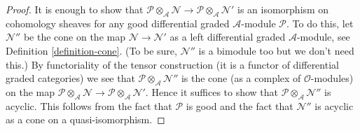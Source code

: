\documentclass[10pt,a4paper]{amsart}
\theoremstyle{plain}
\theoremstyle{definition}
\theoremstyle{remark}
\numberwithin{equation}{subsection}
\begin{document}
\begin{proof}
It is enough to show that
$\mathcal{P} \otimes_\mathcal{A} \mathcal{N} \to
\mathcal{P} \otimes_\mathcal{A} \mathcal{N}'$
is an isomorphism on cohomology sheaves for any good differential
graded $\mathcal{A}$-module $\mathcal{P}$.
To do this, let $\mathcal{N}''$ be the cone on the map
$\mathcal{N} \to \mathcal{N}'$ as a left differential graded
$\mathcal{A}$-module, see Definition \ref{definition-cone}.
(To be sure, $\mathcal{N}''$ is a bimodule too but we
don't need this.) By functoriality of the tensor construction
(it is a functor of differential graded categories)
we see that $\mathcal{P} \otimes_\mathcal{A} \mathcal{N}''$
is the cone (as a complex of $\mathcal{O}$-modules) on the map
$\mathcal{P} \otimes_\mathcal{A} \mathcal{N} \to
\mathcal{P} \otimes_\mathcal{A} \mathcal{N}'$.
Hence it suffices to show that
$\mathcal{P} \otimes_\mathcal{A} \mathcal{N}''$
is acyclic. This follows from the fact that $\mathcal{P}$
is good and the fact that $\mathcal{N}''$ is acyclic
as a cone on a quasi-isomorphism.
\end{proof}
\end{document}
